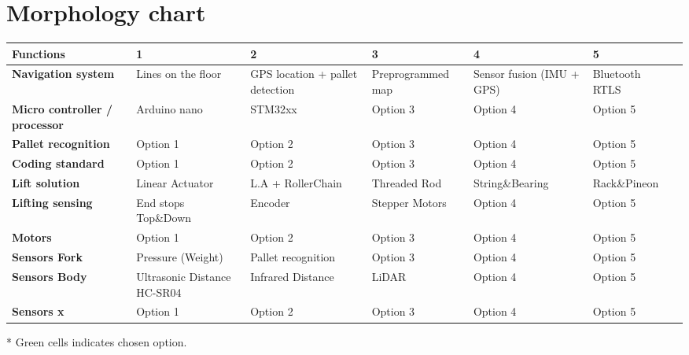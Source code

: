 \documentclass[landscape]{article}
\begin{document}
\section{Morphology chart}
\begin{table}[H]
    \begin{center}
        \begin{tabularx}{\linewidth}{L|L|L|L|L|L|L}
            \textbf{Functions} & \textbf{1} & \textbf{2}& \textbf{3} & 
            \textbf{4} & \textbf{5} \\
            \hline
            \textbf{Navigation system} & Lines on the floor & GPS location + pallet detection & Preprogrammed map  & Sensor fusion (IMU + GPS) & 
            Bluetooth RTLS \\
            \hline
            \textbf{Micro controller / processor} & Arduino nano & STM32xx & Option 3 & Option 4 & 
            Option 5 \\
            \hline
            \textbf{Pallet recognition} & Option 1 & Option 2 & Option 3 & Option 4 & 
            Option 5 \\
            \hline
            \textbf{Coding standard} & Option 1 & Option 2 & Option 3 & Option 4 & 
            Option 5 \\
            \hline
        \textbf{Lift solution} & Linear Actuator & L.A + RollerChain & Threaded Rod& String\&Bearing & Rack\&Pineon \\
            \hline
            \textbf{Lifting sensing} & End stops Top\&Down & Encoder & Stepper Motors & Option 4 & 
            Option 5 \\
            \hline
            \textbf{Motors} & Option 1 & Option 2 & Option 3 & Option 4 & 
            Option 5 \\
            \hline
            \textbf{Sensors Fork} & Pressure (Weight) & Pallet recognition & Option 3 & Option 4 & 
            Option 5 \\
            \hline
            \textbf{Sensors Body} & Ultrasonic Distance HC-SR04 & Infrared Distance & LiDAR & Option 4 & 
            Option 5 \\
            \hline
            \textbf{Sensors x} & Option 1 & Option 2 & Option 3 & Option 4 & 
            Option 5 \\
            \hline
        \end{tabularx}
    \end{center}
\end{table}
* Green cells indicates chosen option.
\end{document}
